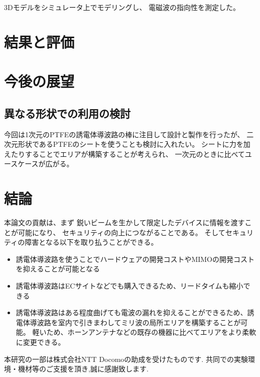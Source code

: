 \documentclass[technicalreport]{ieicej}
\begin{document}
3Dモデルをシミュレータ上でモデリングし、
電磁波の指向性を測定した。

\section{結果と評価}

\section{今後の展望}

\subsection{異なる形状での利用の検討}

今回は1次元のPTFEの誘電体導波路の棒に注目して設計と製作を行ったが、
二次元形状であるPTFEのシートを使うことも検討に入れたい。
シートに力を加えたりすることでエリアが構築することが考えられ、
一次元のときに比べてユースケースが広がる。

\subsection{}

\section{結論}

本論文の貢献は、まず
鋭いビームを生かして限定したデバイスに情報を渡すことが可能になり、
セキュリティの向上につながることである。
そしてセキュリティの障害となる以下を取り払うことができる。

\begin{itemize}
  \item 誘電体導波路を使うことでハードウェアの開発コストやMIMOの開発コストを抑えることが可能となる
  \item 誘電体導波路はECサイトなどでも購入できるため、リードタイムも縮小できる
  \item 誘電体導波路はある程度曲げても電波の漏れを抑えることができるため、誘電体導波路を室内で引きまわしてミリ波の局所エリアを構築することが可能。
  軽いため、ホーンアンテナなどの既存の機器に比べてエリアをより柔軟に変更できる。
\end{itemize}


\ack %
本研究の一部は株式会社NTT Docomoの助成を受けたものです.
共同での実験環境・機材等のご支援を頂き,誠に感謝致します.

%
%
\begin{thebibliography}{99}%
\bibitem{}
\end{thebibliography}

\appendix
\section{}

\begin{biography}
\profile{}{}{}
\end{biography}
\end{document}
